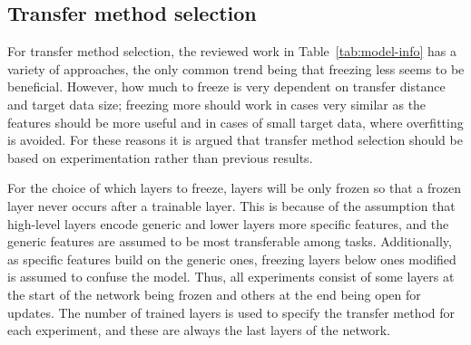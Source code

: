 \documentclass[english,twoside,openright]{UH_DS_MSc}
\begin{document}

\subsection{Transfer method selection}



For transfer method selection, the reviewed work in Table~\ref{tab:model-info} has a variety of approaches, 
the only common trend being that freezing less seems to be beneficial. 
However, how much to freeze is very dependent on transfer distance and target data size;
freezing more should work in cases very similar as the features should be more useful 
and in cases of small target data, where overfitting is avoided.
For these reasons it is argued that transfer method selection should be
based on experimentation rather than previous results.

For the choice of which layers to freeze, layers will be only frozen so that a frozen layer never 
occurs after a trainable layer. This is because of the assumption that high-level layers 
encode generic and lower layers more specific features, and the generic features are assumed to be most transferable among tasks.
 Additionally, as specific features build on the generic ones, freezing layers 
below ones modified is assumed to confuse the model. Thus, all experiments consist of some layers 
at the start of the network being frozen and others at the end being open for updates.
The number of trained layers is used to specify the transfer method 
for each experiment, and these are always the last layers of the network.
\end{document}
